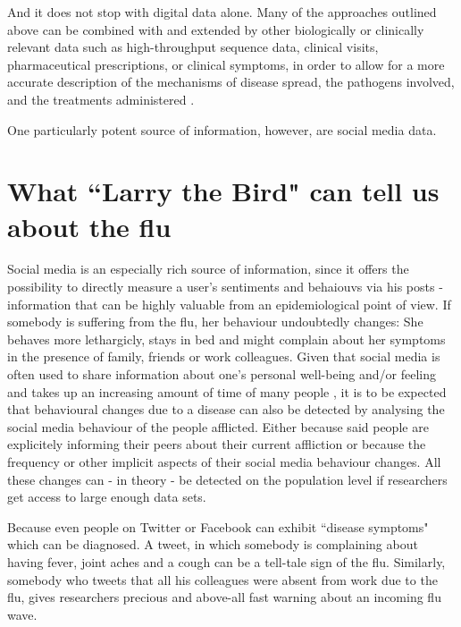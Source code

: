 \documentclass[11pt, a4paper,twoside]{report}\usepackage[]{graphicx}\usepackage[]{color}
\begin{document}
And it does not stop with digital data alone. Many of the approaches outlined above can be combined with and extended by other biologically or clinically relevant data such as high-throughput sequence data, clinical visits, pharmaceutical prescriptions, or clinical symptoms, in order to allow for a more accurate description of the mechanisms of disease spread, the pathogens involved, and the treatments administered \citep{ray_network_2016}.

One particularly potent source of information, however, are social media data.\newline

\section{What ``Larry the Bird" can tell us about the flu}

Social media is an especially rich source of information, since it offers the possibility to directly measure a user's sentiments and behaiouvs via his posts - information that can be highly valuable from an epidemiological point of view. If somebody is suffering from the flu, her behaviour undoubtedly changes: She behaves more lethargicly, stays in bed and might complain about her symptoms in the presence of family, friends or work colleagues. Given that social media is often used to share information about one's personal well-being and/or feeling and takes up an increasing amount of time of many people \citep{scott_time_2017,asano_socialmediatime_2017,bauer_timeonline_2016}, it is to be expected that behavioural changes due to a disease can also be detected by analysing the social media behaviour of the people afflicted. Either because said people are explicitely informing their peers about their current affliction or because the frequency or other implicit aspects of their social media behaviour changes. All these changes can - in theory - be detected on the population level if researchers get access to large enough data sets. 

Because even people on Twitter or Facebook can exhibit ``disease symptoms" which can be diagnosed. A tweet, in which somebody is complaining about having fever, joint aches and a cough can be a tell-tale sign of the flu. Similarly, somebody who tweets that all his colleagues were absent from work due to the flu, gives researchers precious and above-all fast warning about an incoming flu wave.\newline
\end{document}
